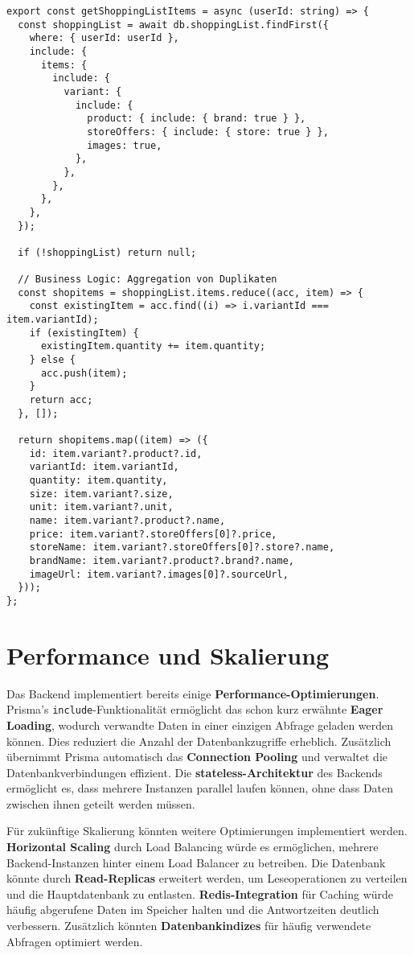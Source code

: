 \begin{lstlisting}[style=typescriptstyle,caption={Service-Layer Beispiel}]
export const getShoppingListItems = async (userId: string) => {
  const shoppingList = await db.shoppingList.findFirst({
    where: { userId: userId },
    include: {
      items: {
        include: {
          variant: {
            include: {
              product: { include: { brand: true } },
              storeOffers: { include: { store: true } },
              images: true,
            },
          },
        },
      },
    },
  });

  if (!shoppingList) return null;

  // Business Logic: Aggregation von Duplikaten
  const shopitems = shoppingList.items.reduce((acc, item) => {
    const existingItem = acc.find((i) => i.variantId === item.variantId);
    if (existingItem) {
      existingItem.quantity += item.quantity;
    } else {
      acc.push(item);
    }
    return acc;
  }, []);

  return shopitems.map((item) => ({
    id: item.variant?.product?.id,
    variantId: item.variantId,
    quantity: item.quantity,
    size: item.variant?.size,
    unit: item.variant?.unit,
    name: item.variant?.product?.name,
    price: item.variant?.storeOffers[0]?.price,
    storeName: item.variant?.storeOffers[0]?.store?.name,
    brandName: item.variant?.product?.brand?.name,
    imageUrl: item.variant?.images[0]?.sourceUrl,
  }));
};
\end{lstlisting}

\section{Performance und Skalierung}

Das Backend implementiert bereits einige \textbf{Performance-Optimierungen}. Prisma's \texttt{include}-Funktionalität ermöglicht das schon kurz erwähnte \textbf{Eager Loading}, wodurch verwandte Daten in einer einzigen Abfrage geladen werden können. Dies reduziert die Anzahl der Datenbankzugriffe erheblich. Zusätzlich übernimmt Prisma automatisch das \textbf{Connection Pooling} und verwaltet die Datenbankverbindungen effizient. Die \textbf{stateless-Architektur} des Backends ermöglicht es, dass mehrere Instanzen parallel laufen können, ohne dass Daten zwischen ihnen geteilt werden müssen.

Für zukünftige Skalierung könnten weitere Optimierungen implementiert werden. \textbf{Horizontal Scaling} durch Load Balancing würde es ermöglichen, mehrere Backend-Instanzen hinter einem Load Balancer zu betreiben. Die Datenbank könnte durch \textbf{Read-Replicas} erweitert werden, um Leseoperationen zu verteilen und die Hauptdatenbank zu entlasten. \textbf{Redis-Integration} für Caching würde häufig abgerufene Daten im Speicher halten und die Antwortzeiten deutlich verbessern. Zusätzlich könnten \textbf{Datenbankindizes} für häufig verwendete Abfragen optimiert werden.

